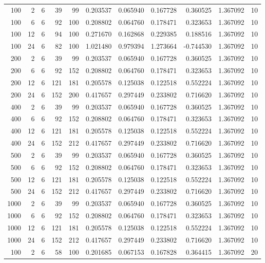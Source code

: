 \begin{table}
\begin{tabular}{rrrrrrrrrrr}
100 & 2 & 6 & 39 & 99 & 0.203537 & 0.065940 & 0.167728 & 0.360525 & 1.367092 & 10 \\
100 & 6 & 6 & 92 & 100 & 0.208802 & 0.064760 & 0.178471 & 0.323653 & 1.367092 & 10 \\
100 & 12 & 6 & 94 & 100 & 0.271670 & 0.162868 & 0.229385 & 0.188516 & 1.367092 & 10 \\
100 & 24 & 6 & 82 & 100 & 1.021480 & 0.979394 & 1.273664 & -0.744530 & 1.367092 & 10 \\
200 & 2 & 6 & 39 & 99 & 0.203537 & 0.065940 & 0.167728 & 0.360525 & 1.367092 & 10 \\
200 & 6 & 6 & 92 & 152 & 0.208802 & 0.064760 & 0.178471 & 0.323653 & 1.367092 & 10 \\
200 & 12 & 6 & 121 & 181 & 0.205578 & 0.125038 & 0.122518 & 0.552224 & 1.367092 & 10 \\
200 & 24 & 6 & 152 & 200 & 0.417657 & 0.297449 & 0.233802 & 0.716620 & 1.367092 & 10 \\
400 & 2 & 6 & 39 & 99 & 0.203537 & 0.065940 & 0.167728 & 0.360525 & 1.367092 & 10 \\
400 & 6 & 6 & 92 & 152 & 0.208802 & 0.064760 & 0.178471 & 0.323653 & 1.367092 & 10 \\
400 & 12 & 6 & 121 & 181 & 0.205578 & 0.125038 & 0.122518 & 0.552224 & 1.367092 & 10 \\
400 & 24 & 6 & 152 & 212 & 0.417657 & 0.297449 & 0.233802 & 0.716620 & 1.367092 & 10 \\
500 & 2 & 6 & 39 & 99 & 0.203537 & 0.065940 & 0.167728 & 0.360525 & 1.367092 & 10 \\
500 & 6 & 6 & 92 & 152 & 0.208802 & 0.064760 & 0.178471 & 0.323653 & 1.367092 & 10 \\
500 & 12 & 6 & 121 & 181 & 0.205578 & 0.125038 & 0.122518 & 0.552224 & 1.367092 & 10 \\
500 & 24 & 6 & 152 & 212 & 0.417657 & 0.297449 & 0.233802 & 0.716620 & 1.367092 & 10 \\
1000 & 2 & 6 & 39 & 99 & 0.203537 & 0.065940 & 0.167728 & 0.360525 & 1.367092 & 10 \\
1000 & 6 & 6 & 92 & 152 & 0.208802 & 0.064760 & 0.178471 & 0.323653 & 1.367092 & 10 \\
1000 & 12 & 6 & 121 & 181 & 0.205578 & 0.125038 & 0.122518 & 0.552224 & 1.367092 & 10 \\
1000 & 24 & 6 & 152 & 212 & 0.417657 & 0.297449 & 0.233802 & 0.716620 & 1.367092 & 10 \\
100 & 2 & 6 & 58 & 100 & 0.201685 & 0.067153 & 0.167828 & 0.364415 & 1.367092 & 20 \\

\end{tabular}
\end{table}
